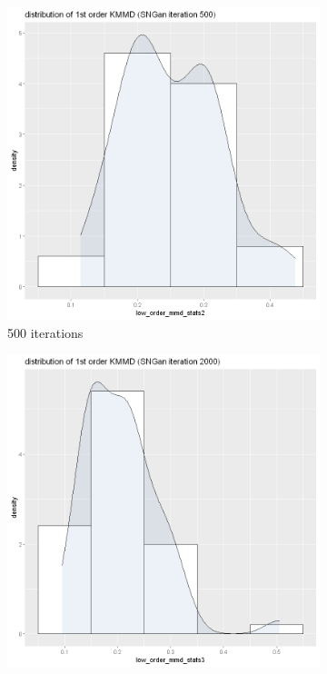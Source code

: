 \documentclass{article}
\begin{document}
\begin{figure}[h!]
    \caption{Dataset Face}
     \centering
     \begin{subfigure}[b]{0.3\textwidth}
         \centering
         \includegraphics[width=\textwidth]{kmmd_figures/sngan_face_lowdist_500.png}
         \caption{500 iterations}
     \end{subfigure}
     \hfill
     \begin{subfigure}[b]{0.3\textwidth}
         \centering
         \includegraphics[width=\textwidth]{kmmd_figures/sngan_face_lowdist_2000.png}

\end{subfigure}
\end{figure}
\end{document}
